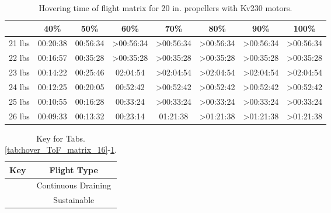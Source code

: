 \documentclass{article}
\begin{document}
\begin{table}[h]
    \centering
    \begin{tabular}{|c|c|c|c|c|c|c|c|}
        \hline
 & 40\% & 50\% & 60\% & 70\% & 80\% & 90\% & 100\%  \\
        \hline
        21 lbs & \cellcolor{red!80} 00:20:38 & \cellcolor{red!80} 00:56:34 & \cellcolor{ForestGreen!80} >00:56:34 & \cellcolor{ForestGreen!80} >00:56:34 & \cellcolor{ForestGreen!80} >00:56:34 & \cellcolor{ForestGreen!80} >00:56:34 & \cellcolor{ForestGreen!80} >00:56:34 \\
        \hline
        22 lbs & \cellcolor{red!80} 00:16:57 & \cellcolor{red!80} 00:35:28 & \cellcolor{ForestGreen!80} >00:35:28 & \cellcolor{ForestGreen!80} >00:35:28 & \cellcolor{ForestGreen!80} >00:35:28 & \cellcolor{ForestGreen!80} >00:35:28 & \cellcolor{ForestGreen!80} >00:35:28 \\
        \hline
        23 lbs & \cellcolor{red!80} 00:14:22 & \cellcolor{red!80} 00:25:46 & \cellcolor{red!80} 02:04:54 & \cellcolor{ForestGreen!80} >02:04:54 & \cellcolor{ForestGreen!80} >02:04:54 & \cellcolor{ForestGreen!80} >02:04:54 & \cellcolor{ForestGreen!80} >02:04:54 \\
        \hline
        24 lbs & \cellcolor{red!80} 00:12:25 & \cellcolor{red!80} 00:20:05 & \cellcolor{red!80} 00:52:42 & \cellcolor{ForestGreen!80} >00:52:42 & \cellcolor{ForestGreen!80} >00:52:42 & \cellcolor{ForestGreen!80} >00:52:42 & \cellcolor{ForestGreen!80} >00:52:42 \\
        \hline
        25 lbs & \cellcolor{red!80} 00:10:55 & \cellcolor{red!80} 00:16:28 & \cellcolor{red!80} 00:33:24 & \cellcolor{ForestGreen!80} >00:33:24 & \cellcolor{ForestGreen!80} >00:33:24 & \cellcolor{ForestGreen!80} >00:33:24 & \cellcolor{ForestGreen!80} >00:33:24 \\
        \hline
        26 lbs & \cellcolor{red!80} 00:09:33 & \cellcolor{red!80} 00:13:32 & \cellcolor{red!80} 00:23:14 & \cellcolor{red!80} 01:21:38 & \cellcolor{ForestGreen!80} >01:21:38 & \cellcolor{ForestGreen!80} >01:21:38 & \cellcolor{ForestGreen!80} >01:21:38 \\
        \hline
    \end{tabular}
    \caption{Hovering time of flight matrix for 20 in. propellers with Kv230 motors.}
    \label{tab:hover_ToF_matrix_20}
\end{table}

\begin{table}[h]
    \centering
    \begin{tabular}{|c|c|}
        \hline
        \rowcolor{lightgray} 
        \textbf{Key} & \textbf{Flight Type} \\
        \hline
        \cellcolor{red!80} &  Continuous Draining \\
        \hline
        \cellcolor{ForestGreen!80} & Sustainable \\
        \hline
    \end{tabular}
    \caption{Key for Tabs. \ref{tab:hover_ToF_matrix_16}-\ref{tab:hover_ToF_matrix_20}.}
    \label{tab:key_ToF_matrix}
\end{table}
\end{document}
